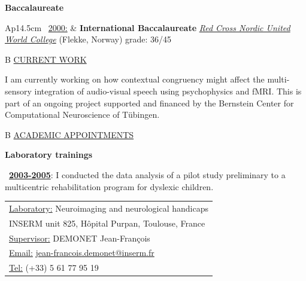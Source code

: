 \documentclass[a4paper,12pt,oneside]{letter}
\begin{document}
{\begin{center}
\Large\textbf{Baccalaureate}
\end{center}

\begin{tabular}{Ap{14.5cm}}
\textbullet~\underline{2000:} & \large\textbf{International Baccalaureate} \newline
				\normalsize \href{http://www.rcnuwc.no/}{\textit{Red Cross Nordic United World College}} (Flekke, Norway) \newline
grade: 36/45 \\
\end{tabular}


\begin{tabular}{B}
\underline{CURRENT WORK}
\end{tabular}

I am currently working on how contextual congruency might affect the multi-sensory integration of audio-visual speech using psychophysics and fMRI. This is part of an ongoing project supported and financed by the Bernstein Center for Computational Neuroscience of Tübingen.


\begin{tabular}{B}
\underline{ACADEMIC APPOINTMENTS}
\end{tabular}

\begin{center}
\Large\textbf{Laboratory trainings}
\end{center}

\begin{minipage}[c]{7.7cm}
\textbullet~\underline{\textbf{2003-2005}}: I conducted the data analysis of a pilot study preliminary to a multicentric rehabilitation program for dyslexic children.
\end{minipage}
\hfill
\begin{minipage}[c]{10cm}
\setlength\minrowclearance{0.2cm}
\setlength\arrayrulewidth{1.5pt}
\small
\begin{tabular}[t]{|l|}\hline
\underline{Laboratory:} Neuroimaging and neurological handicaps\\
INSERM unit 825, Hôpital Purpan, Toulouse, France\\
\underline{Supervisor:} DEMONET Jean-François\\
\underline{Email:} \href{mailto:jean-francois.demonet@inserm.fr}{jean-francois.demonet@inserm.fr}\\
\underline{Tel:} (+33) 5 61 77 95 19 \\ \hline
\end{tabular}
\end{minipage}

}
\end{document}
